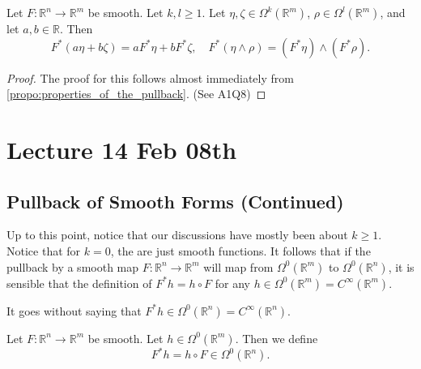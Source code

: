 \documentclass[notoc,notitlepage]{tufte-book}
\begin{document}
\begin{propo}\label{propo:different_linearities_of_the_pullback}
  Let $F : \mathbb{R}^n \to \mathbb{R}^m$ be smooth. Let $k, l \geq 1$. Let $\eta, \zeta \in
  \Omega^k(\mathbb{R}^m)$, $\rho \in \Omega^l(\mathbb{R}^m)$, and let $a, b \in \mathbb{R}$. Then
  \begin{equation}\label{eq:different_linearities_of_the_pullback}
    F^* (a\eta + b\zeta) = aF^* \eta + bF^* \zeta, \quad
    F^*(\eta \land \rho) = (F^* \eta) \land (F^* \rho).
  \end{equation}
\end{propo}

\begin{proof}
  The proof for this follows almost immediately from \cref{propo:properties_of_the_pullback}.
  (See A1Q8)
\end{proof}



\chapter{Lecture 14 Feb 08th}%
\label{chp:lecture_14_feb_08th}

\section{Pullback of Smooth Forms (Continued)}%
\label{sec:pullback_of_smooth_forms_continued}

Up to this point, notice that our discussions have mostly been about $k \geq 1$. Notice
that for $k = 0$, the  are just smooth functions. It follows
that if the pullback by a smooth map $F : \mathbb{R}^n \to \mathbb{R}^m$ will map from
$\Omega^0(\mathbb{R}^m)$ to $\Omega^0(\mathbb{R}^n)$, it is sensible that the definition
of $F^* h = h \circ F$ for any $h \in \Omega^0(\mathbb{R}^m) = C^\infty(\mathbb{R}^m)$.

It goes without saying that $F^* h \in \Omega^0(\mathbb{R}^n) = C^\infty(\mathbb{R}^n)$.

\begin{defn}\label{defn:pullback_of_0_forms}
  Let $F : \mathbb{R}^n \to \mathbb{R}^m$ be smooth. Let $h \in \Omega^0(\mathbb{R}^m)$.
  Then we define
  \begin{equation}\label{eq:pullback_of_0_forms}
    F^* h = h \circ F \in \Omega^0(\mathbb{R}^n).
  \end{equation}
\end{defn}
\end{document}
